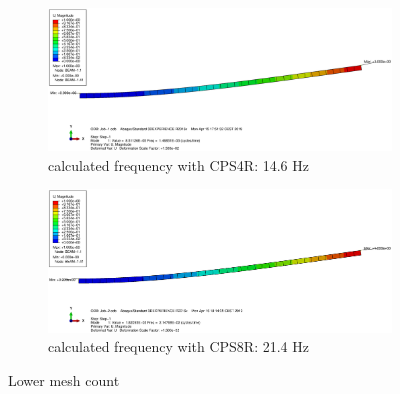 \documentclass[12pt]{article}
\begin{document}
\begin{figure}[!htb]
  \centering
  \begin{subfigure}{.5\textwidth}
    \centering
    \includegraphics[width=0.95\linewidth]{pics/Beam_1_CPS4R}
    \caption{calculated frequency with CPS4R: 14.6 Hz}
  \end{subfigure}%
  \begin{subfigure}{.5\textwidth}
    \centering
    \includegraphics[width=0.95\linewidth]{pics/Beam_1_CPS8R}
    \caption{calculated frequency with CPS8R: 21.4 Hz}
   \end{subfigure}
  \caption{Lower mesh count}
  \label{fig:1}
\end{figure}
\end{document}
